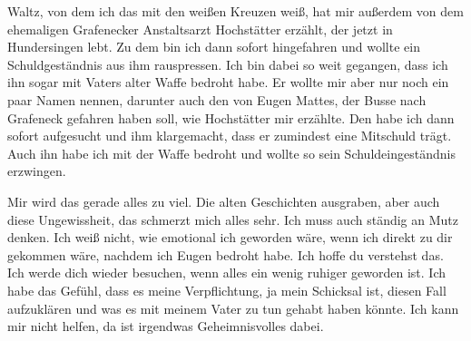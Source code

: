 Waltz, von dem ich das mit den weißen Kreuzen weiß, hat mir außerdem von dem
ehemaligen Grafenecker Anstaltsarzt Hochstätter erzählt, der jetzt in
Hundersingen lebt. Zu dem bin ich dann sofort hingefahren und wollte ein
Schuldgeständnis aus ihm rauspressen. Ich bin dabei so weit gegangen, dass ich
ihn sogar mit Vaters alter Waffe bedroht habe. Er wollte mir aber nur noch ein
paar Namen nennen, darunter auch den von Eugen Mattes, der Busse nach Grafeneck
gefahren haben soll, wie Hochstätter mir erzählte. Den habe ich dann sofort
aufgesucht und ihm klargemacht, dass er zumindest eine Mitschuld trägt. Auch
ihn habe ich mit der Waffe bedroht und wollte so sein Schuldeingeständnis
erzwingen.

Mir wird das gerade alles zu viel. Die alten Geschichten ausgraben, aber auch
diese Ungewissheit, das schmerzt mich alles sehr. Ich muss auch ständig an Mutz
denken. Ich weiß nicht, wie emotional ich geworden wäre, wenn ich direkt zu dir
gekommen wäre, nachdem ich Eugen bedroht habe. Ich hoffe du verstehst das. Ich
werde dich wieder besuchen, wenn alles ein wenig ruhiger geworden ist. Ich habe
das Gefühl, dass es meine Verpflichtung, ja mein Schicksal ist, diesen Fall
aufzuklären und was es mit meinem Vater zu tun gehabt haben könnte. Ich kann
mir nicht helfen, da ist irgendwas Geheimnisvolles dabei.
